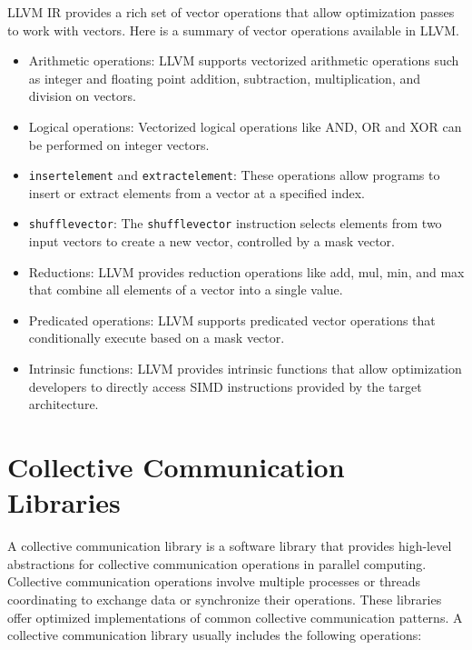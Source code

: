 LLVM IR provides a rich set of vector operations that allow
optimization passes to work with vectors. Here is a summary of vector
operations available in LLVM.

\begin{itemize}
  \item Arithmetic operations: LLVM supports vectorized arithmetic
  operations such as integer and floating point addition, subtraction,
  multiplication, and division on vectors.
  \item Logical operations: Vectorized logical operations like AND, OR
  and XOR can be performed on integer vectors.
  \item \texttt{insertelement} and \texttt{extractelement}: These
  operations allow programs to insert or extract elements from a
  vector at a specified index.
  \item \texttt{shufflevector}: The \texttt{shufflevector} instruction
  selects elements from two input vectors to create a new vector,
  controlled by a mask vector.
  \item Reductions: LLVM provides reduction operations like add, mul,
  min, and max that combine all elements of a vector into a single
  value.
  \item Predicated operations: LLVM supports predicated vector
  operations that conditionally execute based on a mask vector.
  \item Intrinsic functions: LLVM provides intrinsic functions that
  allow optimization developers to directly access SIMD instructions
  provided by the target architecture.
\end{itemize}


\section {Collective Communication Libraries}

A collective communication library is a software library that provides
high-level abstractions for collective communication operations in
parallel computing. Collective communication operations involve
multiple processes or threads coordinating to exchange data or
synchronize their operations. These libraries offer optimized
implementations of common collective communication patterns.
A collective communication library usually includes the following operations:

